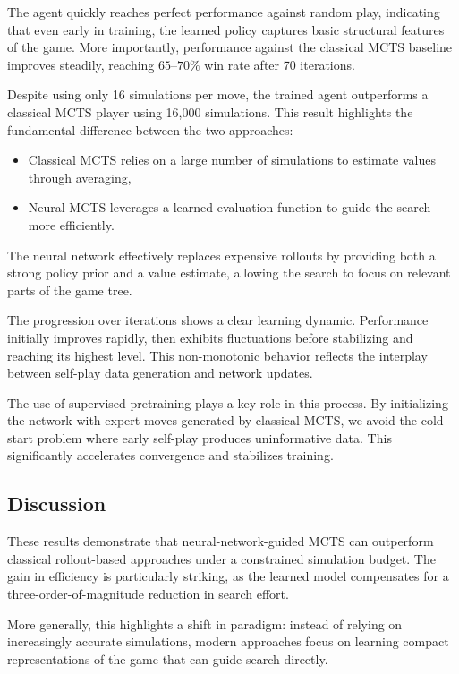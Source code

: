 \documentclass[11pt,a4paper]{article}
\begin{document}
The agent quickly reaches perfect performance against random play, indicating that even early in training, the learned policy captures basic structural features of the game. More importantly, performance against the classical MCTS baseline improves steadily, reaching $65$--$70\%$ win rate after 70 iterations.

\medskip

Despite using only 16 simulations per move, the trained agent outperforms a classical MCTS player using 16,000 simulations. This result highlights the fundamental difference between the two approaches:

\begin{itemize}
    \item Classical MCTS relies on a large number of simulations to estimate values through averaging,
    \item Neural MCTS leverages a learned evaluation function to guide the search more efficiently.
\end{itemize}

The neural network effectively replaces expensive rollouts by providing both a strong policy prior and a value estimate, allowing the search to focus on relevant parts of the game tree.

\medskip 

The progression over iterations shows a clear learning dynamic. Performance initially improves rapidly, then exhibits fluctuations before stabilizing and reaching its highest level. This non-monotonic behavior reflects the interplay between self-play data generation and network updates.

The use of supervised pretraining plays a key role in this process. By initializing the network with expert moves generated by classical MCTS, we avoid the cold-start problem where early self-play produces uninformative data. This significantly accelerates convergence and stabilizes training.

\subsection{Discussion}

These results demonstrate that neural-network-guided MCTS can outperform classical rollout-based approaches under a constrained simulation budget. The gain in efficiency is particularly striking, as the learned model compensates for a three-order-of-magnitude reduction in search effort.

More generally, this highlights a shift in paradigm: instead of relying on increasingly accurate simulations, modern approaches focus on learning compact representations of the game that can guide search directly.
\end{document}
